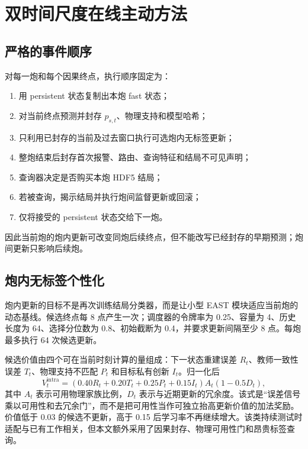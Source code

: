 \section{双时间尺度在线主动方法}

\subsection{严格的事件顺序}

对每一炮和每个因果终点，执行顺序固定为：
\begin{enumerate}[label=\arabic*.]
  \item 用 persistent 状态复制出本炮 fast 状态；
  \item 对当前终点预测并封存 $p_{s,t}$、物理支持和模型哈希；
  \item 只利用已封存的当前及过去窗口执行可选炮内无标签更新；
  \item 整炮结束后封存首次报警、路由、查询特征和结局不可见声明；
  \item 查询器决定是否购买本炮 HDF5 结局；
  \item 若被查询，揭示结局并执行炮间监督更新或回滚；
  \item 仅将接受的 persistent 状态交给下一炮。
\end{enumerate}
因此当前炮的炮内更新可改变同炮后续终点，但不能改写已经封存的早期预测；炮间更新只影响后续炮。

\subsection{炮内无标签个性化}

炮内更新的目标不是再次训练结局分类器，而是让小型 EAST 模块适应当前炮的动态基线。候选终点每 8 点产生一次；调度器的令牌率为 0.25、容量为 4、历史长度为 64、选择分位数为 0.8、初始截断为 0.4，并要求更新间隔至少 8 点。每炮最多执行 64 次候选更新。

候选价值由四个可在当前时刻计算的量组成：下一状态重建误差 $R_t$、教师一致性误差 $T_t$、物理支持不匹配 $P_t$ 和目标私有创新 $I_t$。归一化后
\begin{equation}
V_t^{\mathrm{intra}}=
\left(0.40R_t+0.20T_t+0.25P_t+0.15I_t\right)
A_t\left(1-0.5D_t\right),
\label{eq:intra-value}
\end{equation}
其中 $A_t$ 表示可用物理家族比例，$D_t$ 表示与近期更新的冗余度。该式是``误差信号乘以可用性和去冗余门''，而不是把可用性当作可独立抬高更新价值的加法奖励。价值低于 0.03 的候选不更新，高于 0.15 后学习率不再继续增大。该类持续测试时适配与已有工作相关\citep{wang2022cotta}，但本文额外采用了因果封存、物理可用性门和昂贵标签查询。

